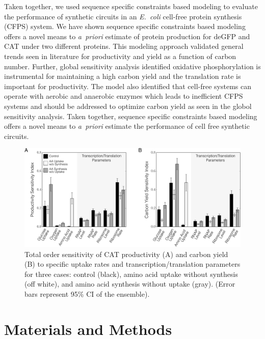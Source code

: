 \documentclass[journal=asbcd6,manuscript=article]{achemso}
\begin{document}
Taken together, we used sequence specific constraints based modeling to evaluate the performance of synthetic circuits in an \emph{E.~coli} cell-free protein synthesis (CFPS) system.
We have shown sequence specific constraints based modeling offers a novel means to \emph{a~priori} estimate of protein production for deGFP and CAT under two different proteins.
This modeling approach validated general trends seen in literature for productivity and yield as a function of carbon number.
Further, global sensitivity analysis identified oxidative phosphorylation is instrumental for maintaining a high carbon yield and the translation rate is important for productivity.
The model also identified that cell-free systems can operate with aerobic and anaerobic enzymes which leads to inefficient CFPS systems and should be addressed to optimize carbon yield as seen in the globol sensitivity analysis.
Taken together, sequence specific constraints based modeling offers a novel means to \emph{a~priori} estimate the performance of cell free synthetic circuits.



\begin{figure}[h!]
\includegraphics[width=1.00\textwidth]{./Figures/SI_CAT.pdf}
\caption{Total order sensitivity of CAT productivity (A) and carbon yield (B) to specific uptake rates and transcription/translation parameters for three cases: control (black), amino acid uptake without synthesis (off white), and amino acid synthesis without uptake (gray). (Error bars represent 95\% CI of the ensemble).}
\label{fig:SI_CAT}
\end{figure}


\section*{Materials and Methods}
\end{document}
